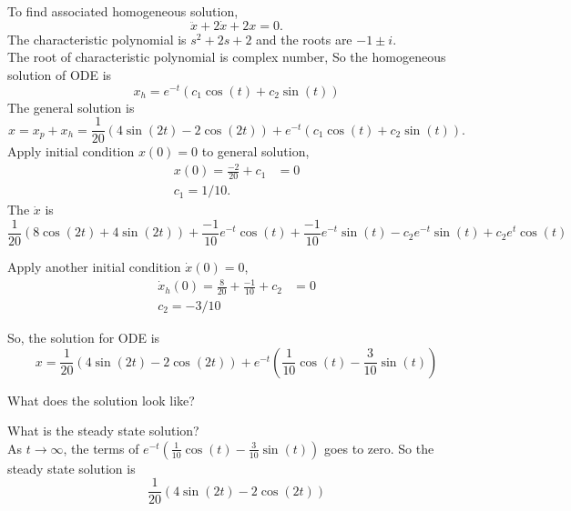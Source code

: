 To find associated homogeneous solution,
\begin{equation*}
  \ddot x+2\dot x+2x = 0. 
\end{equation*}
The characteristic polynomial is $s^2 + 2s + 2$ and the roots are
$-1 \pm i$.\\
The root of characteristic polynomial is complex number, So the
homogeneous solution of ODE is
\begin{equation*}
  x_ h =  e^{-t} \left( c_ 1 \cos(t) + c_ 2 \sin(t) \right)
\end{equation*}
The general solution is
\begin{equation*}
  x = x_ p + x_ h = \frac{1}{20} \left(4 \sin(2t) - 2 \cos(2t) \right)
  + e^{-t} \left( c_ 1 \cos(t) + c_ 2 \sin(t) \right).
\end{equation*}
Apply initial condition $x(0) = 0$ to general solution,
\begin{align*}
  x(0) = \frac{-2}{20} + c_1 &= 0 \\
  c_1 = 1/10. 
\end{align*}
The $\dot{x}$ is
\begin{equation*}
  \frac{1}{20}\left( 8 \cos(2t) + 4 \sin (2t) \right) +
  \frac{-1}{10} e^{-t} \cos (t) + \frac{-1}{10} e^{-t} \sin (t) 
  - c_ 2 e^{-t} \sin(t) + c_2 e^{t} \cos(t)
\end{equation*}

Apply another initial condition $\dot{x} (0) = 0$,
\begin{align*}
  \dot{x} _h (0) =  \frac{8}{20} + \frac{-1}{10} + c_2 &= 0 \\
  c_2 = -3 / 10 
\end{align*}

So, the solution for ODE is
\begin{equation*}
  x = \frac{1}{20} \left(4 \sin(2t) - 2 \cos(2t) \right)
  + e^{-t} \left( \frac{1}{10} \cos(t) - \frac{3}{10} \sin(t) \right)
\end{equation*}


\begin{problem}
  What does the solution look like?
\end{problem}
What is the steady state solution?\\

As $t \to \infty$, the terms of $\displaystyle
e^{-t} \left( \frac{1}{10} \cos(t) - \frac{3}{10} \sin(t) \right)$
goes to zero. So the steady state solution is
\begin{equation*}
  \frac{1}{20} \left(4 \sin(2t) - 2 \cos(2t) \right)
\end{equation*}

